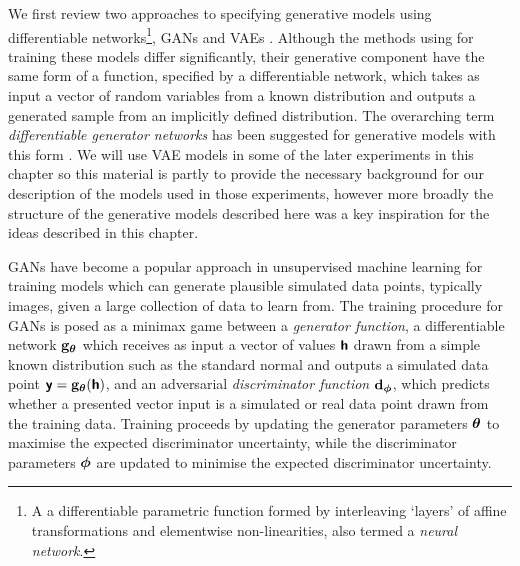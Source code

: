 We first review two approaches to specifying generative models using differentiable networks\footnote{A a differentiable parametric function formed by interleaving `layers' of affine transformations and elementwise non-linearities, also termed a \emph{neural network}.}, \acfp{GAN} \citep{goodfellow2014generative} and \acfp{VAE} \citep{kingma2013auto,rezende2014stochastic}. Although the methods using for training these models differ significantly, their generative component have the same form of a function, specified by a differentiable network, which takes as input a vector of random variables from a known distribution and outputs a generated sample from an implicitly defined distribution. The overarching term \emph{differentiable generator networks} has been suggested for generative models with this form \citep{goodfellow2016deep}. We will use \ac{VAE} models in some of the later experiments in this chapter so this material is partly to provide the necessary background for our description of the models used in those experiments, however more broadly the structure of the generative models described here was a key inspiration for the ideas described in this chapter.

\acp{GAN} \citep{goodfellow2014generative} have become a popular approach in unsupervised machine learning for training models which can generate plausible simulated data points, typically images, given a large collection of data to learn from. The training procedure for \acp{GAN} is posed as a minimax game between a \emph{generator function}, a differentiable network ${\mathbf{g}}_{\boldsymbol{\theta}}$ which receives as input a vector of values $\boldsymbol{\mathsf{h}}$ drawn from a simple known distribution such as the standard normal and outputs a simulated data point $\boldsymbol{\mathsf{y}} = {\mathbf{g}}_{\boldsymbol{\theta}}(\boldsymbol{\mathsf{h}})$, and an adversarial \emph{discriminator function} ${\mathbf{d}}_{\boldsymbol{\phi}}$, which predicts whether a presented vector input is a simulated or real data point drawn from the training data.  Training proceeds by updating the generator parameters $\boldsymbol{\theta}$ to maximise the expected discriminator uncertainty, while the discriminator parameters $\boldsymbol{\phi}$ are updated to minimise the expected discriminator uncertainty.


